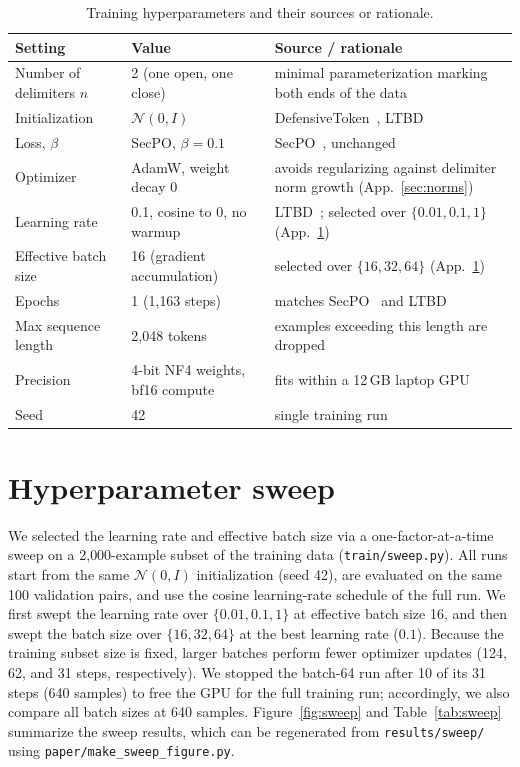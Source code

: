\documentclass{article}
\begin{document}
\begin{table}[h]
  \caption{Training hyperparameters and their sources or rationale.}
  \label{tab:hparams}
  \centering
  \small
  \begin{tabular}{p{3.2cm}p{4.3cm}p{4.9cm}}
    \toprule
    Setting & Value & Source / rationale \\
    \midrule
    Number of delimiters $n$ & 2 (one open, one close) & minimal parameterization marking both ends of the data \\
    Initialization & $\mathcal{N}(0, I)$ & DefensiveToken~\cite{chen2025defensivetoken}, LTBD~\cite{zhao2026ltbd} \\
    Loss, $\beta$ & SecPO, $\beta = 0.1$ & SecPO~\cite{chen2026secpo}, unchanged \\
    Optimizer & AdamW, weight decay 0 & avoids regularizing against delimiter norm growth (App.~\ref{sec:norms}) \\
    Learning rate & 0.1, cosine to 0, no warmup & LTBD~\cite{zhao2026ltbd}; selected over $\{0.01, 0.1, 1\}$ (App.~\ref{app:sweep}) \\
    Effective batch size & 16 (gradient accumulation) & selected over $\{16, 32, 64\}$ (App.~\ref{app:sweep}) \\
    Epochs & 1 (1{,}163 steps) & matches SecPO~\cite{chen2026secpo} and LTBD~\cite{zhao2026ltbd} \\
    Max sequence length & 2{,}048 tokens & examples exceeding this length are dropped \\
    Precision & 4-bit NF4 weights, bf16 compute & fits within a 12\,GB laptop GPU \\
    Seed & 42 & single training run \\
    \bottomrule
  \end{tabular}
\end{table}

\section{Hyperparameter sweep}
\label{app:sweep}

We selected the learning rate and effective batch size via a one-factor-at-a-time sweep on a 2{,}000-example subset of the training data (\texttt{train/sweep.py}). All runs start from the same $\mathcal{N}(0, I)$ initialization (seed 42), are evaluated on the same 100 validation pairs, and use the cosine learning-rate schedule of the full run. We first swept the learning rate over $\{0.01, 0.1, 1\}$ at effective batch size 16, and then swept the batch size over $\{16, 32, 64\}$ at the best learning rate ($0.1$). Because the training subset size is fixed, larger batches perform fewer optimizer updates (124, 62, and 31 steps, respectively). We stopped the batch-64 run after 10 of its 31 steps (640 samples) to free the GPU for the full training run; accordingly, we also compare all batch sizes at 640 samples. Figure~\ref{fig:sweep} and Table~\ref{tab:sweep} summarize the sweep results, which can be regenerated from \texttt{results/sweep/} using \texttt{paper/make\_sweep\_figure.py}.
\end{document}
